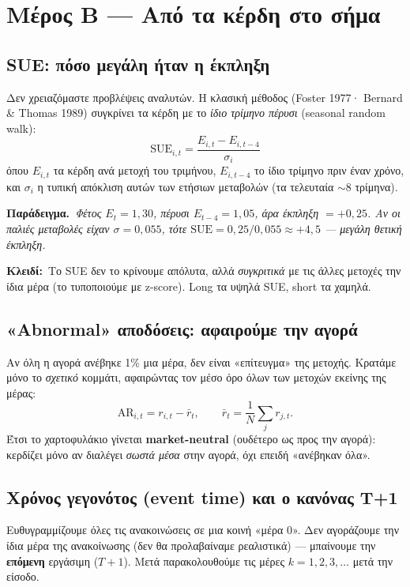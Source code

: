 \documentclass[11pt]{article}
\newcommand{\key}[1]{\par\medskip\noindent\colorbox{soft}{\parbox{\dimexpr\linewidth-2\fboxsep}{\textcolor{accent}{\textbf{Κλειδί:}}\ #1}}\par\medskip}
\newcommand{\ex}[1]{\par\smallskip\noindent\textbf{\textcolor{accent}{Παράδειγμα.}}\ \textit{#1}\par\smallskip}
\begin{document}
\section{Μέρος Β — Από τα κέρδη στο σήμα}

\subsection{SUE: πόσο μεγάλη ήταν η έκπληξη}
Δεν χρειαζόμαστε προβλέψεις αναλυτών. Η κλασική μέθοδος (Foster 1977· Bernard \& Thomas 1989)
συγκρίνει τα κέρδη με το \emph{ίδιο τρίμηνο πέρυσι} (seasonal random walk):
\[ \boxed{\ \mathrm{SUE}_{i,t}=\frac{E_{i,t}-E_{i,t-4}}{\sigma_{i}}\ } \]
όπου $E_{i,t}$ τα κέρδη ανά μετοχή του τριμήνου, $E_{i,t-4}$ το ίδιο τρίμηνο πριν έναν χρόνο,
και $\sigma_i$ η τυπική απόκλιση αυτών των ετήσιων μεταβολών (τα τελευταία $\sim$8 τρίμηνα).

\ex{Φέτος $E_{t}=1{,}30$, πέρυσι $E_{t-4}=1{,}05$, άρα έκπληξη $=+0{,}25$.
Αν οι παλιές μεταβολές είχαν $\sigma=0{,}055$, τότε
$\mathrm{SUE}=0{,}25/0{,}055\approx +4{,}5$ — \emph{μεγάλη} θετική έκπληξη.}

\key{Το SUE δεν το κρίνουμε απόλυτα, αλλά \emph{συγκριτικά} με τις άλλες μετοχές την ίδια μέρα
(το τυποποιούμε με z-score). Long τα υψηλά SUE, short τα χαμηλά.}

\subsection{«Abnormal» αποδόσεις: αφαιρούμε την αγορά}
Αν όλη η αγορά ανέβηκε 1\% μια μέρα, δεν είναι «επίτευγμα» της μετοχής. Κρατάμε μόνο το
\emph{σχετικό} κομμάτι, αφαιρώντας τον μέσο όρο όλων των μετοχών εκείνης της μέρας:
\[ \mathrm{AR}_{i,t}=r_{i,t}-\bar{r}_{t},\qquad \bar{r}_t=\frac{1}{N}\sum_{j}r_{j,t}. \]
Έτσι το χαρτοφυλάκιο γίνεται \textbf{market-neutral} (ουδέτερο ως προς την αγορά): κερδίζει
μόνο αν διαλέγει \emph{σωστά μέσα} στην αγορά, όχι επειδή «ανέβηκαν όλα».

\subsection{Χρόνος γεγονότος (event time) και ο κανόνας T+1}
Ευθυγραμμίζουμε όλες τις ανακοινώσεις σε μια κοινή «μέρα 0». Δεν αγοράζουμε την ίδια μέρα της
ανακοίνωσης (δεν θα προλαβαίναμε ρεαλιστικά) — μπαίνουμε την \textbf{επόμενη} εργάσιμη
($T{+}1$). Μετά παρακολουθούμε τις μέρες $k=1,2,3,\dots$ μετά την είσοδο.
\end{document}
